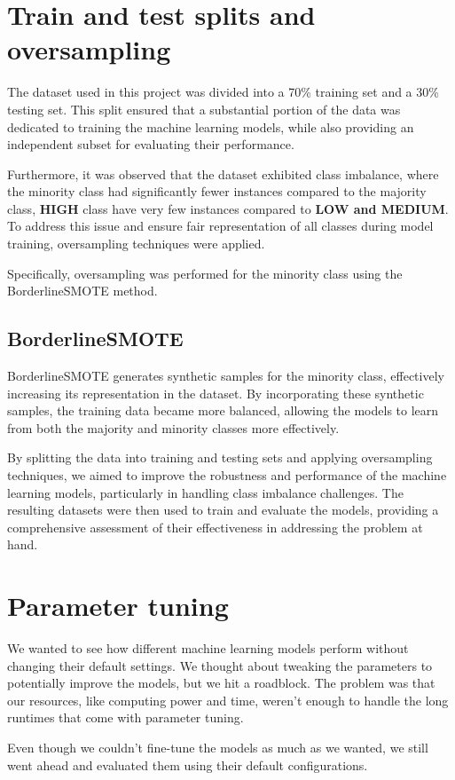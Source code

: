 \section{Train and test splits and oversampling}
The dataset used in this project was divided into a 70\% training set and a 30\% testing set. This split ensured that a substantial portion of the data was dedicated to training the machine learning models, while also providing an independent subset for evaluating their performance.

Furthermore, it was observed that the dataset exhibited class imbalance, where the minority class had significantly fewer instances compared to the majority class, \textbf{HIGH} class have very few instances compared to \textbf{LOW and MEDIUM}. To address this issue and ensure fair representation of all classes during model training, oversampling techniques were applied.

Specifically, oversampling was performed for the minority class using the BorderlineSMOTE method.
\subsection{BorderlineSMOTE}
BorderlineSMOTE generates synthetic samples for the minority class, effectively increasing its representation in the dataset. By incorporating these synthetic samples, the training data became more balanced, allowing the models to learn from both the majority and minority classes more effectively.

By splitting the data into training and testing sets and applying oversampling techniques, we aimed to improve the robustness and performance of the machine learning models, particularly in handling class imbalance challenges. The resulting datasets were then used to train and evaluate the models, providing a comprehensive assessment of their effectiveness in addressing the problem at hand.
\section{Parameter tuning}
We wanted to see how different machine learning models perform without changing their default settings. We thought about tweaking the parameters to potentially improve the models, but we hit a roadblock. The problem was that our resources, like computing power and time, weren't enough to handle the long runtimes that come with parameter tuning.

Even though we couldn't fine-tune the models as much as we wanted, we still went ahead and evaluated them using their default configurations.

